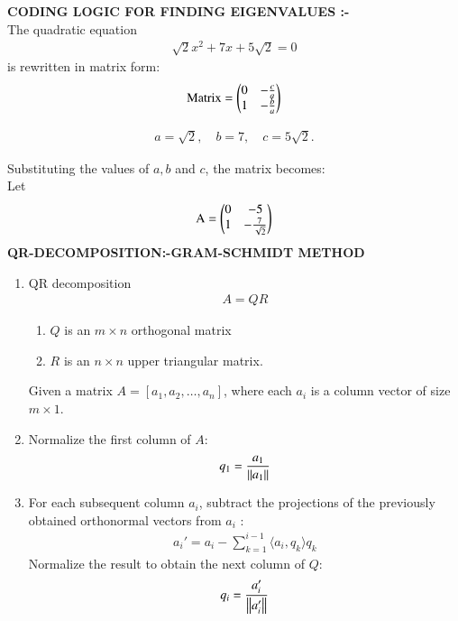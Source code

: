 \documentclass[journal]{IEEEtran}
\numberwithin{equation}{enumi}
\numberwithin{figure}{enumi}
\begin{document}
\begin{enumerate}
\textbf{CODING LOGIC FOR FINDING EIGENVALUES :-}\\


The quadratic equation 
\begin{align}
\sqrt{2}x^2 + 7x + 5\sqrt{2} = 0
\end{align}
is rewritten in matrix form:
\begin{align}
\text{Matrix} =
\begin{pmatrix}0 & -\frac{c}{a} \\
1 & -\frac{b}{a}
\end{pmatrix}
\end{align}

\begin{align}
a = \sqrt{2}, \quad b = 7, \quad c = 5\sqrt{2}.
\end{align}

Substituting the values of $a,b$ and $c$, the matrix becomes:\\
Let
\begin{align}
\text{A} =
\begin{pmatrix}0 & -5 \\
1 & -\frac{7}{\sqrt{2}}
\end{pmatrix}
\end{align}
\textbf{QR-DECOMPOSITION:-GRAM-SCHMIDT METHOD}\\



\begin{enumerate}

\item QR decomposition 
\begin{align}
A = QR
\end{align}
\begin{enumerate}
    \item $Q$ is an $ m \times n $ orthogonal matrix
    \item $R$ is an $n \times n$ upper triangular matrix.
\end{enumerate}
Given a matrix $ A = [a_1, a_2, \dots, a_n] $, where each $ a_i $ is a column vector of size $ m \times 1 $.

\item Normalize the first column of $A$:
\begin{align}
q_1 = \frac{a_1}{\left\lVert a_1\right\rVert}
\end{align}

\item  For each subsequent column $ a_i $, subtract the projections of the previously obtained orthonormal vectors from $ a_i $ :
\begin{align}
a_i' = a_i - \sum_{k=1}^{i-1} \langle a_i, q_k \rangle q_k
\end{align}
Normalize the result to obtain the next column of \( Q \):
\begin{align}
q_i = \frac{a_i'}{\left\lVert a_i'\right\rVert}
\end{align}


\end{enumerate}
\end{enumerate}
\end{document}
